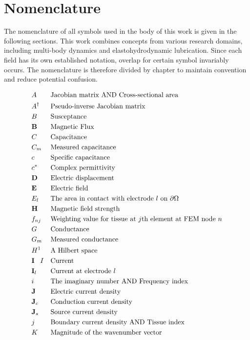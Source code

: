 
\chapter*{Nomenclature}

The nomenclature of all symbols used in the body of this work is given in the following sections. This work combines concepts from various research domains, including multi-body dynamics and elastohydrodynamic lubrication. Since each field has its own established notation, overlap for certain symbol invariably occurs. The nomenclature is therefore divided by chapter to maintain convention and reduce potential confusion.

\begin{align*}
	&A &&\text{Jacobian matrix AND Cross-sectional area}\\
	&A^{\dagger} &&\text{Pseudo-inverse Jacobian matrix}\\
	&B &&\text{Susceptance}\\
	&\mathbf{B} &&\text{Magnetic Flux}\\
	&C &&\text{Capacitance}\\
	&C_m &&\text{Measured capacitance}\\
	&c &&\text{Specific capacitance}\\
	&c^* &&\text{Complex permittivity}\\
	&\mathbf{D} &&\text{Electric displacement}\\
	&\mathbf{E} &&\text{Electric field}\\
	&E_l &&\text{The area in contact with electrode } l \text{ on } \partial \Omega \\	
	&\mathbf{H} &&\text{Magnetic field strength}\\
	&f_{nj} &&\text{Weighting value for tissue at } j \text{th element at FEM node } n \\
	&G &&\text{Conductance}\\
	&G_m &&\text{Measured conductance}\\
	&H^1 &&\text{A Hilbert space}\\	
	&\mathbf{I} \text{\textcolor{white}{iii}} I &&\text{Current}\\	
	&\mathbf{I}_l &&\text{Current at electrode } l \\
	&i &&\text{The imaginary number AND Frequency index}\\	
	&\mathbf{J} &&\text{Electric current density}\\	
	&\mathbf{J}_c &&\text{Conduction current density}\\
	&\mathbf{J}_s &&\text{Source current density}\\	
	&j &&\text{Boundary current density AND Tissue index}\\
	&K &&\text{Magnitude of the wavenumber vector}\\
\end{align*}

